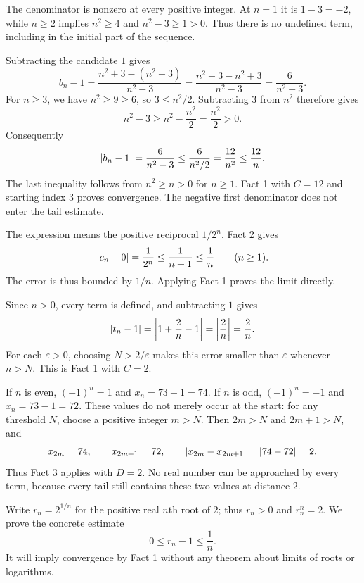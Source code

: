 The denominator is nonzero at every positive integer. At $n=1$
it is $1-3=-2$, while $n\geq2$ implies $n^2\geq4$ and
$n^2-3\geq1>0$. Thus there is no undefined term, including in
the initial part of the sequence.

Subtracting the candidate $1$ gives
\[
 b_n-1
 =\frac{n^2+3-(n^2-3)}{n^2-3}
 =\frac{n^2+3-n^2+3}{n^2-3}
 =\frac6{n^2-3}.
\]
For $n\geq3$, we have $n^2\geq9\geq6$, so $3\leq n^2/2$.
Subtracting $3$ from $n^2$ therefore gives
\[
 n^2-3\geq n^2-\frac{n^2}{2}=\frac{n^2}{2}>0.
\]
Consequently
\[
 \left|b_n-1\right|
 =\frac6{n^2-3}
 \leq\frac6{n^2/2}
 =\frac{12}{n^2}
 \leq\frac{12}{n}.
\]
The last inequality follows from $n^2\geq n>0$ for $n\geq1$.
Fact 1 with $C=12$ and starting index $3$ proves convergence.
The negative first denominator does not enter the tail estimate.


The expression means the positive reciprocal $1/2^n$.
Fact 2 gives
\[
 \left|c_n-0\right|=\frac1{2^n}\leq\frac1{n+1}\leq\frac1n
 \qquad(n\geq1).
\]
The error is thus bounded by $1/n$. Applying Fact 1 proves the
limit directly.


Since $n>0$, every term is defined, and subtracting $1$ gives
\[
 \left|t_n-1\right|
 =\left|1+\frac2n-1\right|
 =\left|\frac2n\right|
 =\frac2n.
\]
For each $\varepsilon>0$, choosing $N>2/\varepsilon$ makes this
error smaller than $\varepsilon$ whenever $n>N$. This is Fact 1
with $C=2$.


If $n$ is even, $(-1)^n=1$ and $x_n=73+1=74$.
If $n$ is odd, $(-1)^n=-1$ and $x_n=73-1=72$.
These values do not merely occur at the start: for any threshold
$N$, choose a positive integer $m>N$. Then $2m>N$ and
$2m+1>N$, and
\[
 x_{2m}=74,\qquad x_{2m+1}=72,\qquad
 \left|x_{2m}-x_{2m+1}\right|=\left|74-72\right|=2.
\]
Thus Fact 3 applies with $D=2$. No real number can be approached
by every term, because every tail still contains these two values
at distance $2$.


Write $r_n=2^{1/n}$ for the positive real $n$th root of $2$;
thus $r_n>0$ and $r_n^n=2$. We prove the concrete estimate
\[
 0\leq r_n-1\leq\frac1n.
\]
It will imply convergence by Fact 1 without any theorem about
limits of roots or logarithms.

